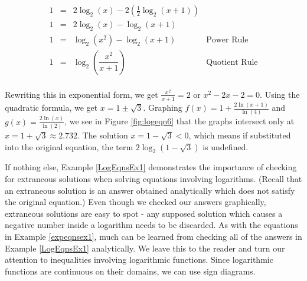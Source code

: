 {\begin{enumerate}
\[ \begin{array}{rclr}

1 & = & 2 \log_{2}(x) - 2 \left(\frac{1}{2} \log_{2}(x+1)\right) & \\ [2pt]
1 &= & 2\log_{2}(x) - \log_{2}(x+1) & \\ [2pt]
1 & = & \log_{2}\left(x^2\right) - \log_{2}(x+1) & \text{Power Rule} \\ [6pt]
1 & = & \log_{2}\left( \dfrac{x^{2}}{x+1}\right) & \text{Quotient Rule} \\ \end{array}\]

Rewriting this in exponential form, we get $ \frac{x^{2}}{x+1} = 2$ or $x^2 -2x-2 = 0$.  Using the quadratic formula, we get $x = 1 \pm \sqrt{3}$.  Graphing $f(x) = 1 + \frac{2\ln(x+1)}{\ln(4)}$ and $g(x) = \frac{2 \ln(x)}{\ln(2)}$, we see in Figure \ref{fig:logeqn6} that the graphs intersect only at $x = 1 + \sqrt{3} \approx 2.732$.  The solution $x = 1 - \sqrt{3} < 0$, which means if substituted into the original equation, the term $2 \log_{2}\left(1 - \sqrt{3}\right)$ is undefined.

{}

\end{enumerate}
}



\pagebreak

If nothing else,  Example \ref{LogEqnsEx1} demonstrates the importance of checking for extraneous solutions when solving equations involving logarithms.  (Recall that an extraneous solution is an answer obtained analytically which does not satisfy the original equation.) Even though we checked our answers graphically, extraneous solutions are easy to spot - any supposed solution which causes a negative number inside a logarithm needs to be discarded.  As with the equations in Example \ref{expeqnsex1}, much can be learned from checking all of the answers in Example \ref{LogEqnsEx1} analytically.  We leave this to the reader and turn our attention to inequalities involving logarithmic functions.  Since logarithmic functions are continuous on their domains, we can use sign diagrams.  

